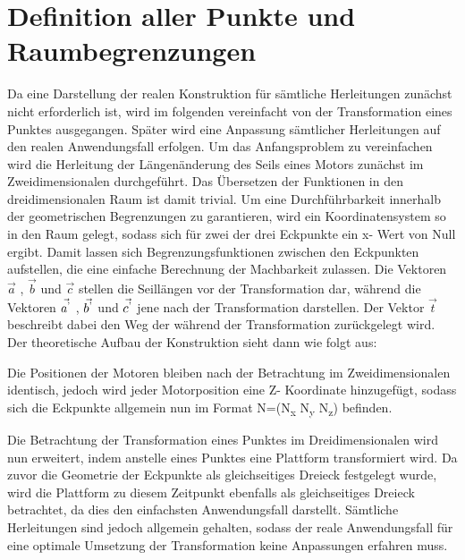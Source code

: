 \section{Definition aller Punkte und Raumbegrenzungen}
		Da eine Darstellung der realen Konstruktion für sämtliche Herleitungen zunächst nicht erforderlich ist, wird im folgenden vereinfacht von der Transformation eines Punktes ausgegangen. Später wird eine Anpassung sämtlicher Herleitungen auf den realen Anwendungsfall erfolgen.
		Um das Anfangsproblem zu vereinfachen wird die Herleitung der Längenänderung des Seils eines Motors zunächst im Zweidimensionalen durchgeführt. Das Übersetzen der Funktionen in den dreidimensionalen Raum ist damit trivial.
		Um eine Durchführbarkeit innerhalb der geometrischen Begrenzungen zu garantieren, wird ein Koordinatensystem so in den Raum gelegt, sodass sich für zwei der drei Eckpunkte ein x- Wert von Null ergibt. Damit lassen sich Begrenzungsfunktionen zwischen den Eckpunkten aufstellen, die eine einfache Berechnung der Machbarkeit zulassen. Die Vektoren $\vec{a}$ , $\vec{b}$ und $\vec{c}$ stellen die Seillängen vor der Transformation dar, während die Vektoren $\vec{a\textsuperscript{'}}$ , $\vec{b\textsuperscript{'}}$ und $\vec{c\textsuperscript{'}}$ jene nach der Transformation darstellen. Der Vektor $\vec{t}$ beschreibt dabei den Weg der während der Transformation zurückgelegt wird. Der theoretische Aufbau der Konstruktion sieht dann wie folgt aus:
		\begin{figure}[H]	
			\centering	
			
		\end{figure}
	\pagebreak
		Die Positionen der Motoren bleiben nach der Betrachtung im Zweidimensionalen identisch, jedoch wird jeder Motorposition eine Z- Koordinate hinzugefügt, sodass sich die Eckpunkte allgemein nun im Format N=(N\textsubscript{x} N\textsubscript{y} N\textsubscript{z}) befinden. 
		\begin{figure}[H]
			\centering	
			
		\end{figure} 
	\pagebreak	
		Die Betrachtung der Transformation eines Punktes im Dreidimensionalen wird nun erweitert, indem anstelle eines Punktes eine Plattform transformiert wird. Da zuvor die Geometrie der Eckpunkte als gleichseitiges Dreieck festgelegt wurde, wird die Plattform zu diesem Zeitpunkt ebenfalls als gleichseitiges Dreieck betrachtet, da dies den einfachsten Anwendungsfall darstellt. Sämtliche Herleitungen sind jedoch allgemein gehalten, sodass der reale Anwendungsfall für eine optimale Umsetzung der Transformation keine Anpassungen erfahren muss.	
		\begin{figure}[H]
			\centering	
			
		\end{figure}
	\pagebreak